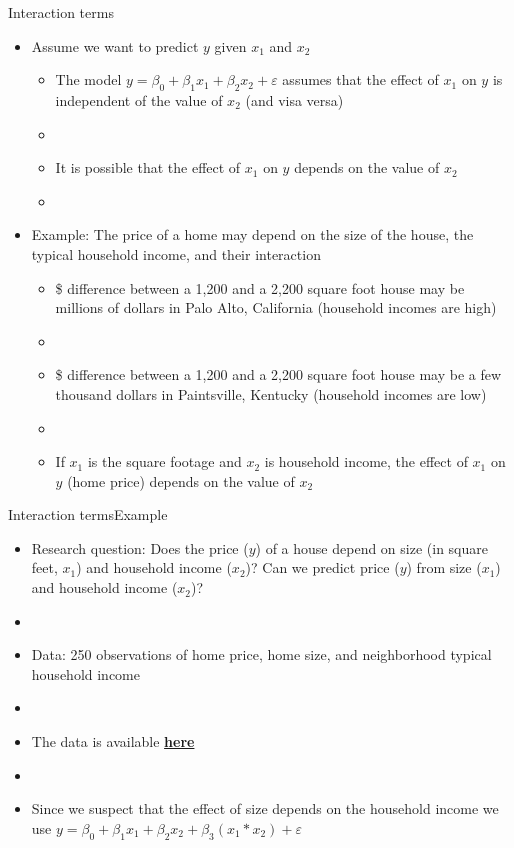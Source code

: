 \documentclass[xcolor=dvipsnames]{beamer}
\begin{document}
\begin{frame}{Interaction terms}
	\begin{itemize}
		\item Assume we want to predict $y$ given $x_1$ and $x_2$ \pause
		\begin{itemize}
			\item The model $y = \beta_0 + \beta_1 x_1 + \beta_2 x_2 + \varepsilon$ assumes that the effect of $x_1$ on $y$ is independent of the value of $x_2$ (and visa versa) \pause
			\item[]
			\item It is possible that the effect of $x_1$ on $y$ depends on the value of $x_2$ \pause
			\item[]
		\end{itemize}
		\item Example: The price of a home may depend on the size of the house, the typical household income, and their interaction \pause
		\begin{itemize}
			\item \$ difference between a 1,200 and a 2,200 square foot house may be millions of dollars in Palo Alto, California (household incomes are high) \pause
			\item[]
			\item \$ difference between a 1,200 and a 2,200 square foot house may be a few thousand dollars in Paintsville, Kentucky (household incomes are low) \pause
			\item[]
			\item If $x_1$ is the square footage and $x_2$ is household income, the effect of $x_1$ on $y$ (home price) depends on the value of $x_2$ 
		\end{itemize}
	\end{itemize}
\end{frame}

\begin{frame}{Interaction terms}{Example}
	\begin{itemize}
		\item Research question: Does the price ($y$) of a house depend on size (in square feet, $x_1$) and household income ($x_2$)? Can we predict price ($y$) from size ($x_1$) and household income ($x_2$)? \pause
		\item[]
		\item Data: 250 observations of home price, home size, and neighborhood typical household income \pause
		\item[]
		\item The data is available  \href{https://wordpress.nmsu.edu/ptrainor/2019/11/26/ast-505-materials/}{\textbf{here}} \pause
		\item[]
		\item Since we suspect that the effect of size depends on the household income we use $y = \beta_0 + \beta_1 x_1 + \beta_2 x_2 + \beta_3 (x_1 * x_2) + \varepsilon$
	\end{itemize}
\end{frame}
\end{document}
